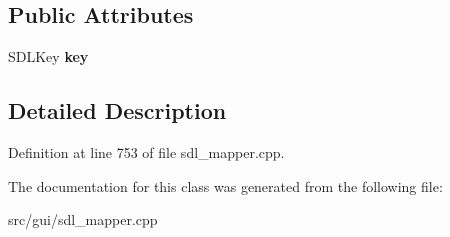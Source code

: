 \subsection*{Public Attributes}
\begin{DoxyCompactItemize}
\item 
\hypertarget{classCKeyBind_a5db2e06f00521cdcd4bdf961cb02c336}{S\-D\-L\-Key {\bfseries key}}\label{classCKeyBind_a5db2e06f00521cdcd4bdf961cb02c336}

\end{DoxyCompactItemize}


\subsection{Detailed Description}


Definition at line 753 of file sdl\-\_\-mapper.\-cpp.



The documentation for this class was generated from the following file\-:\begin{DoxyCompactItemize}
\item 
src/gui/sdl\-\_\-mapper.\-cpp\end{DoxyCompactItemize}
